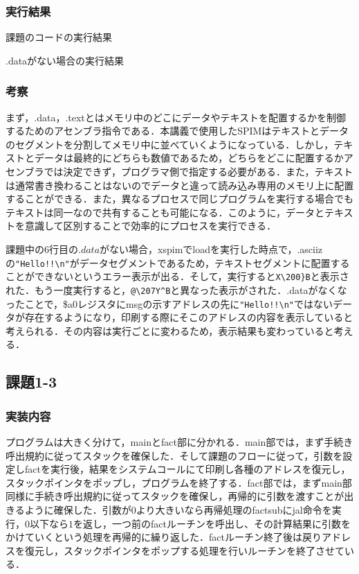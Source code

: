 \documentclass[a4j,11pt]{jarticle}
\begin{document}
\subsubsection{実行結果}
  \begin{screen}
    課題のコードの実行結果
    \end{screen}
  \begin{screen}
    .dataがない場合の実行結果
    \end{screen}
  \subsubsection{考察}
  まず，.data，.textとはメモリ中のどこにデータやテキストを配置するかを制御するためのアセンブラ指令である．本講義で使用したSPIMはテキストとデータのセグメントを分割してメモリ中に並べていくようになっている．しかし，テキストとデータは最終的にどちらも数値であるため，どちらをどこに配置するかアセンブラでは決定できず，プログラマ側で指定する必要がある．また，テキストは通常書き換わることはないのでデータと違って読み込み専用のメモリ上に配置することができる．また，異なるプロセスで同じプログラムを実行する場合でもテキストは同一なので共有することも可能になる．このように，データとテキストを意識して区別することで効率的にプロセスを実行できる．

  課題中の6行目の$.data$がない場合，xspimでloadを実行した時点で，.asciizの\verb|"Hello!!\n"|がデータセグメントであるため，テキストセグメントに配置することができないというエラー表示が出る．そして，実行すると\verb|X\200}B|と表示された．もう一度実行すると，\verb|@\207Y^B|と異なった表示がされた．.dataがなくなったことで，\$a0レジスタにmsgの示すアドレスの先に\verb|"Hello!!\n"|ではないデータが存在するようになり，印刷する際にそこのアドレスの内容を表示していると考えられる．その内容は実行ごとに変わるため，表示結果も変わっていると考える．
 \subsection{課題1-3}
  \subsubsection{実装内容}
  プログラムは大きく分けて，mainとfact部に分かれる．main部では，まず手続き呼出規約に従ってスタックを確保した．そして課題のフローに従って，引数を設定しfactを実行後，結果をシステムコールにて印刷し各種のアドレスを復元し，スタックポインタをポップし，プログラムを終了する．fact部では，まずmain部同様に手続き呼出規約に従ってスタックを確保し，再帰的に引数を渡すことが出きるように確保した．引数が$0$より大きいなら再帰処理のfactsubにjal命令を実行，$0$以下なら$1$を返し，一つ前のfactルーチンを呼出し、その計算結果に引数をかけていくという処理を再帰的に繰り返した．factルーチン終了後は戻りアドレスを復元し，スタックポインタをポップする処理を行いルーチンを終了させている．
\end{document}
